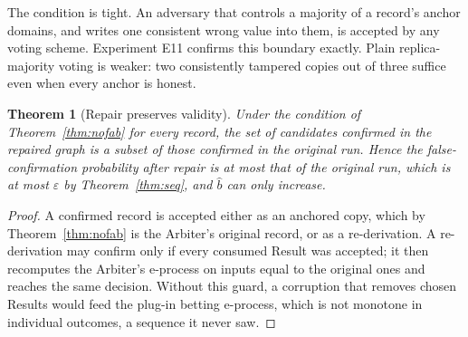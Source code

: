 \documentclass[pdflatex,sn-mathphys-num]{sn-jnl}
\theoremstyle{thmstyleone}
\newtheorem{theorem}{Theorem}
\theoremstyle{thmstyletwo}
\theoremstyle{thmstylethree}
\newcommand{\bhat}{\hat b}
\begin{document}
The condition is tight. An adversary that controls a majority of a record's anchor domains, and writes one consistent wrong value into them, is accepted by any voting scheme. Experiment E11 confirms this boundary exactly. Plain replica-majority voting is weaker: two consistently tampered copies out of three suffice even when every anchor is honest.

\begin{theorem}[Repair preserves validity]\label{thm:repair}
Under the condition of Theorem~\ref{thm:nofab} for every record, the set of candidates confirmed in the repaired graph is a subset of those confirmed in the original run. Hence the false-confirmation probability after repair is at most that of the original run, which is at most $\varepsilon$ by Theorem~\ref{thm:seq}, and $\bhat$ can only increase.
\end{theorem}
\begin{proof}
A confirmed record is accepted either as an anchored copy, which by Theorem~\ref{thm:nofab} is the Arbiter's original record, or as a re-derivation. A re-derivation may confirm only if every consumed Result was accepted; it then recomputes the Arbiter's e-process on inputs equal to the original ones and reaches the same decision. Without this guard, a corruption that removes chosen Results would feed the plug-in betting e-process, which is not monotone in individual outcomes, a sequence it never saw.
\end{proof}
\end{document}
